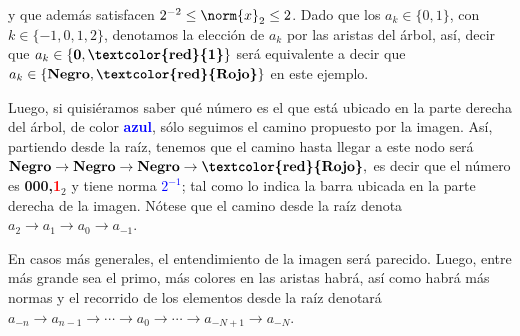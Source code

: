 y que además satisfacen $2^{-2}\leq\norm{x}_2\leq 2$. Dado que los $a_k\in\{0,1\}$, con $k\in\{-1,0,1,2\}$, denotamos la elección de $a_k$ por las aristas del árbol, así, decir que $a_k\in\{\textbf{0},\textbf{\textcolor{red}{1}}\}$ será equivalente a decir que $a_k\in\{\textbf{Negro},\textbf{\textcolor{red}{Rojo}}\}$
en este ejemplo. 

Luego, si quisiéramos saber qué número es el que está ubicado en la parte derecha del árbol, de color \textbf{\textcolor{blue}{azul}}, sólo seguimos el camino propuesto por la imagen. Así, partiendo desde la raíz, tenemos que el camino hasta llegar a este nodo será $\textbf{Negro}\to\textbf{Negro}\to\textbf{Negro}\to\textbf{\textcolor{red}{Rojo}},$ es decir que el número es \textbf{000,}\textbf{\textcolor{red}{1}}$_2$ y tiene norma \textbf{\textcolor{blue}{$2^{-1}$}}; tal como lo indica la barra ubicada en la parte derecha de la imagen. Nótese que el camino desde la raíz denota $a_2\to a_1\to a_0\to a_{-1}$.
\begin{remark}
	En casos más generales, el entendimiento de la imagen será parecido. Luego, entre más grande sea el primo, más colores en las aristas habrá, así como habrá más normas y el recorrido de los elementos desde la raíz denotará $a_{-n}\to a_{n-1}\to\cdots\to a_0 \to \cdots \to a_{-N+1} \to a_{-N}.$
\end{remark}
